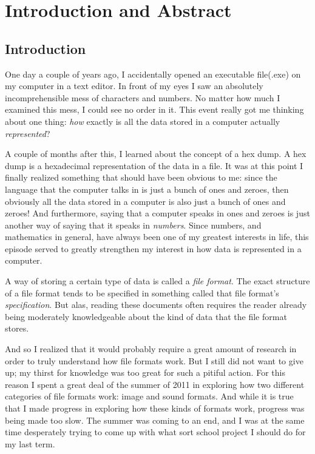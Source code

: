 \begin{comment}
  
\end{comment}

\chapter{Introduction and Abstract}

\section{Introduction}

One day a couple of years ago, I accidentally opened an executable
file(.exe) on my computer in a text editor. In front of my eyes I saw
an absolutely incomprehensible mess of characters and numbers. No
matter how much I examined this mess, I could see no order in it. This
event really got me thinking about one thing: \textit{how} exactly is
all the data stored in a computer actually \textit{represented}?

A couple of months after this, I learned about the concept of a hex
dump. A hex dump is a hexadecimal representation of the data in a
file. It was at this point I finally realized something that should
have been obvious to me: since the language that the computer talks in
is just a bunch of ones and zeroes, then obviously all the data stored
in a computer is also just a bunch of ones and zeroes! And
furthermore, saying that a computer speaks in ones and zeroes is just
another way of saying that it speaks in \textit{numbers}. Since
numbers, and mathematics in general, have always been one of my
greatest interests in life, this episode served to greatly strengthen
my interest in how data is represented in a computer.

A way of storing a certain type of data is called a \textit{file
  format}. The exact structure of a file format tends to be specified
in something called that file format's \textit{specification}. But
alas, reading these documents often requires the reader already being
moderately knowledgeable about the kind of data that the file format
stores.

And so I realized that it would probably require a great amount of
research in order to truly understand how file formats work. But I
still did not want to give up; my thirst for knowledge was too great
for such a pitiful action.  For this reason I spent a great deal of
the summer of 2011 in exploring how two different categories of file
formats work: image and sound formats. And while it is true that I
made progress in exploring how these kinds of formats work, progress
was being made too slow. The summer was coming to an end, and I was at
the same time desperately trying to come up with what sort school
project I should do for my last term.

